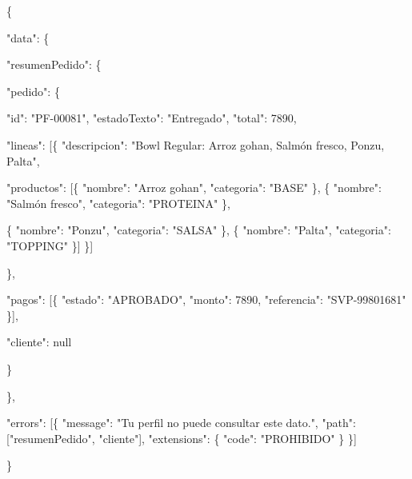 \begin{codigo}
\{\par
\hspace*{2\ttw}"data":\allowbreak{} \{\par
\hspace*{4\ttw}"resumenPedido":\allowbreak{} \{\par
\hspace*{6\ttw}"pedido":\allowbreak{} \{\par
\hspace*{8\ttw}"id":\allowbreak{} "PF-\allowbreak{}00081",\allowbreak{} "estadoTexto":\allowbreak{} "Entregado",\allowbreak{} "total":\allowbreak{} 7890,\allowbreak{}\par
\hspace*{8\ttw}"lineas":\allowbreak{} [\allowbreak{}\{ "descripcion":\allowbreak{} "Bowl Regular:\allowbreak{} Arroz gohan,\allowbreak{} Salmón fresco,\allowbreak{} Ponzu,\allowbreak{} Palta",\allowbreak{}\par
\hspace*{21\ttw}"productos":\allowbreak{} [\allowbreak{}\{ "nombre":\allowbreak{} "Arroz gohan",\allowbreak{} "categoria":\allowbreak{} "BASE" \},\allowbreak{} \{ "nombre":\allowbreak{} "Salmón fresco",\allowbreak{} "categoria":\allowbreak{} "PROTEINA" \},\allowbreak{}\par
\hspace*{35\ttw}\{ "nombre":\allowbreak{} "Ponzu",\allowbreak{} "categoria":\allowbreak{} "SALSA" \},\allowbreak{} \{ "nombre":\allowbreak{} "Palta",\allowbreak{} "categoria":\allowbreak{} "TOPPING" \}] \}]\par
\hspace*{6\ttw}\},\allowbreak{}\par
\hspace*{6\ttw}"pagos":\allowbreak{} [\allowbreak{}\{ "estado":\allowbreak{} "APROBADO",\allowbreak{} "monto":\allowbreak{} 7890,\allowbreak{} "referencia":\allowbreak{} "SVP-\allowbreak{}99801681" \}],\allowbreak{}\par
\hspace*{6\ttw}"cliente":\allowbreak{} null\par
\hspace*{4\ttw}\}\par
\hspace*{2\ttw}\},\allowbreak{}\par
\hspace*{2\ttw}"errors":\allowbreak{} [\allowbreak{}\{ "message":\allowbreak{} "Tu perfil no puede consultar este dato.\allowbreak{}",\allowbreak{} "path":\allowbreak{} [\allowbreak{}"resumenPedido",\allowbreak{} "cliente"],\allowbreak{} "extensions":\allowbreak{} \{ "code":\allowbreak{} "PROHIBIDO" \} \}]\par
\}\par
\end{codigo}

